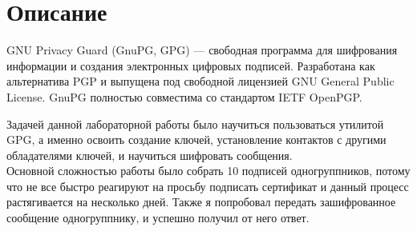 \section{Описание}

GNU Privacy Guard (GnuPG, GPG) — свободная программа для шифрования информации и создания электронных цифровых подписей. Разработана как альтернатива PGP и выпущена под свободной лицензией GNU General Public License. GnuPG полностью совместима со стандартом IETF OpenPGP. 

Задачей данной лабораторной работы было научиться пользоваться утилитой GPG, а именно освоить создание ключей, установление контактов с другими обладателями ключей, и научиться шифровать сообщения.\\
Основной сложностью работы было собрать 10 подписей одногруппников, потому что не все быстро реагируют на просьбу подписать сертификат и данный процесс растягивается на несколько дней. Также я попробовал передать зашифрованное сообщение одногруппнику, и успешно получил от него ответ.

\pagebreak

